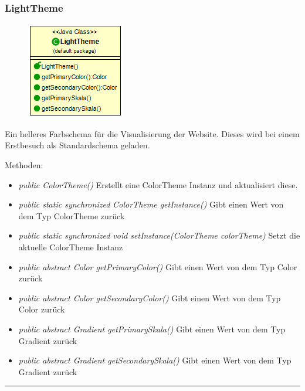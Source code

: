 \subsubsection{LightTheme}
\begin{minipage}{0.3\textwidth}
    \begin{figure}[H]
        {\centering\includegraphics[scale = 0.5
        ]{media/view/theme/LightTheme_Class.png}}
    \end{figure}
    \end{minipage} \hfill
    \begin{minipage}{0.6\textwidth}
        Ein helleres Farbschema für die Visualisierung der Website. Dieses wird bei einem Erstbesuch als Standardschema geladen.
    \end{minipage}
Methoden: \begin{itemize} [noitemsep]
    \item \emph{public ColorTheme()} Erstellt eine ColorTheme Instanz und aktualisiert diese.
    \item \emph{public static synchronized ColorTheme getInstance()} Gibt einen Wert von dem Typ ColorTheme zurück
    \item \emph{public static synchronized void setInstance(ColorTheme colorTheme)} Setzt die aktuelle ColorTheme Instanz
    \item \emph{public abstract Color getPrimaryColor()} Gibt einen Wert von dem Typ Color zurück
    \item \emph{public abstract Color getSecondaryColor()} Gibt einen Wert von dem Typ Color zurück
    \item \emph{public abstract Gradient getPrimarySkala()} Gibt einen Wert von dem Typ Gradient zurück
    \item \emph{public abstract Gradient getSecondarySkala()}  Gibt einen Wert von dem Typ Gradient zurück
\end{itemize}

\rule{\textwidth}{0.4pt}
